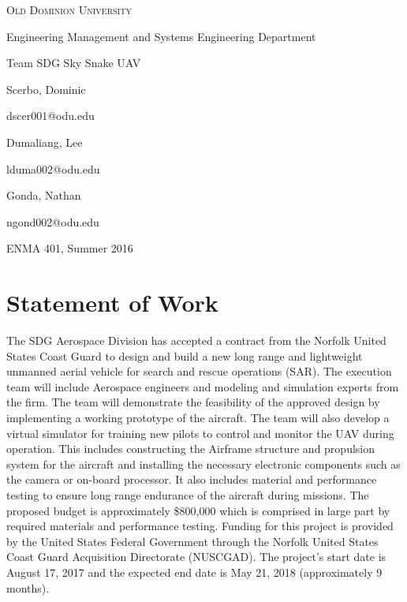 \documentclass{article}
\begin{document}
\begin{titlepage}

\centering
{\vspace {5cm}}
{\scshape \LARGE Old Dominion University \par \vspace{5cm}}
{\large Engineering Management and Systems Engineering Department \par \vspace{1cm}}
{\large Team SDG Sky Snake UAV \par \vspace{1cm}}

{\normalsize Scerbo, Dominic \par \vspace{0.5cm}}
{\normalsize dscer001@odu.edu \par \vspace{0.5cm}}
{\normalsize Dumaliang, Lee \par \vspace{0.5cm}}
{\normalsize lduma002@odu.edu \par \vspace{0.5cm}}
{\normalsize Gonda, Nathan \par \vspace{0.5cm}}
{\normalsize ngond002@odu.edu \par \vspace{1cm}}

{\large ENMA 401, Summer 2016 \par \vspace{0.5cm}}


\end{titlepage}

\newpage
{}

\section{Statement of Work}
The SDG Aerospace Division has accepted a contract from the Norfolk United States Coast Guard to design and build a new long range and lightweight unmanned aerial vehicle for search and rescue operations (SAR). The execution team will include Aerospace engineers and modeling and simulation experts from the firm. The team will demonstrate the feasibility of the approved design by implementing a working prototype of the aircraft. The team will also develop a virtual simulator for training new pilots to control and monitor the UAV during operation. This includes constructing the Airframe structure and propulsion system for the aircraft and installing the necessary electronic components such as the camera or on-board processor. It also includes material and performance testing to ensure long range endurance of the aircraft during missions. The proposed budget is approximately \$800,000 which is comprised in large part by required materials and performance testing. Funding for this project is provided by the United States Federal Government through the Norfolk United States Coast Guard Acquisition Directorate (NUSCGAD). The project’s start date is August 17, 2017 and the expected end date is May 21, 2018 (approximately 9 months).
\end{document}
